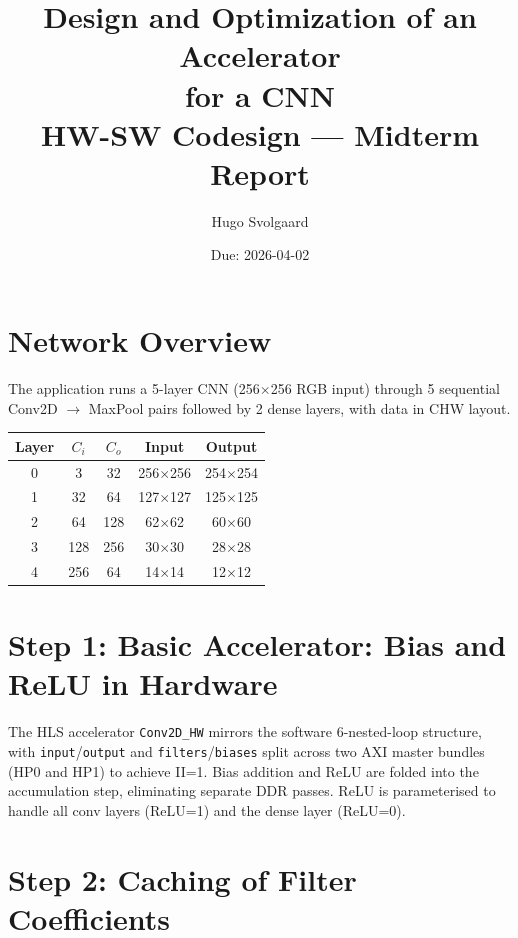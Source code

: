 \documentclass[11pt,a4paper]{article}
\title{\textbf{Design and Optimization of an Accelerator\\
for a CNN}\\[0.4em]
\large HW-SW Codesign --- Midterm Report}
\author{Hugo Svolgaard}
\date{Due: 2026-04-02\null}
\begin{document}
\maketitle

\section*{Network Overview}

The application runs a 5-layer CNN (256$\times$256 RGB input) through 5 sequential
Conv2D $\to$ MaxPool pairs followed by 2 dense layers, with data in CHW layout.

\begin{center}
\begin{tabular}{ccccc}
\toprule
Layer & $C_i$ & $C_o$ & Input & Output \\
\midrule
0 & 3   & 32  & 256$\times$256 & 254$\times$254 \\
1 & 32  & 64  & 127$\times$127 & 125$\times$125 \\
2 & 64  & 128 & 62$\times$62   & 60$\times$60   \\
3 & 128 & 256 & 30$\times$30   & 28$\times$28   \\
4 & 256 & 64  & 14$\times$14   & 12$\times$12   \\
\bottomrule
\end{tabular}
\end{center}

\section{Step 1: Basic Accelerator: Bias and ReLU in Hardware}

The HLS accelerator \texttt{Conv2D\_HW} mirrors the software 6-nested-loop structure, with
\texttt{input}/\texttt{output} and \texttt{filters}/\texttt{biases} split across two AXI master
bundles (HP0 and HP1) to achieve II=1. Bias addition and ReLU are folded into the
accumulation step, eliminating separate DDR passes. ReLU is parameterised to handle
all conv layers (ReLU=1) and the dense layer (ReLU=0).

\section{Step 2: Caching of Filter Coefficients}
\end{document}
